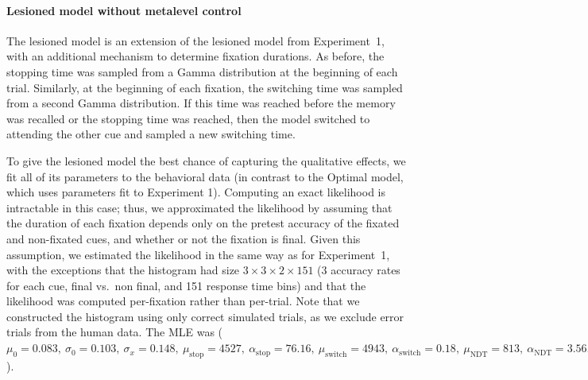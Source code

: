 \paragraph{Lesioned model without metalevel control}

The lesioned model is an extension of the lesioned model from Experiment~1, with an additional mechanism to determine fixation durations. As before, the stopping time was sampled from a Gamma distribution at the beginning of each trial. Similarly, at the beginning of each fixation, the switching time was sampled from a second Gamma distribution. If this time was reached before the memory was recalled or the stopping time was reached, then the model switched to attending the other cue and sampled a new switching time.

To give the lesioned model the best chance of capturing the qualitative effects, we fit all of its parameters to the behavioral data (in contrast to the Optimal model, which uses parameters fit to Experiment 1). Computing an exact likelihood is intractable in this case; thus, we approximated the likelihood by assuming that the duration of each fixation depends only on the pretest accuracy of the fixated and non-fixated cues, and whether or not the fixation is final. Given this assumption, we estimated the likelihood in the same way as for Experiment~1, with the exceptions that the histogram had size $3 \times 3 \times 2 \times 151$ (3 accuracy rates for each cue, final vs.~non final, and 151 response time bins) and that the likelihood was computed per-fixation rather than per-trial. Note that we constructed the histogram using only correct simulated trials, as we exclude error trials from the human data. The MLE was (\(
    \mu_0 = 0.083,\ 
    \sigma_0 = 0.103,\ 
    \sigma_x = 0.148,\ 
    \mu_\text{stop} = 4527,\ 
    \alpha_\text{stop} = 76.16,\ 
    \mu_\text{switch} = 4943,\ 
    \alpha_\text{switch} = 0.18,\ 
    \mu_\text{NDT} = 813,\ 
    \alpha_\text{NDT} = 3.56,\ 
\)).
